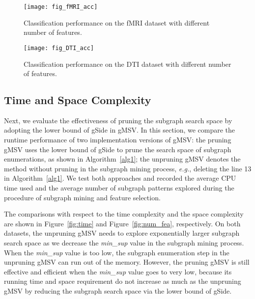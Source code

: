 \documentclass[conference]{IEEEtran}
\newcommand{\gscore}[0]{gSide}
\newcommand{\galgo}[0]{gMSV}
\begin{document}
\begin{figure}[t]
\centering
    \begin{minipage}[l]{\columnwidth}
      \centering
      \texttt{[image: fig\_fMRI\_acc]}
    \end{minipage}
\caption{Classification performance on the fMRI dataset with different number of features.}\label{fig:fMRI}
\end{figure}\begin{figure}[t]
\centering
    \begin{minipage}[l]{\columnwidth}
      \centering
      \texttt{[image: fig\_DTI\_acc]}
    \end{minipage}
\caption{Classification performance on the DTI dataset with different number of features.}\label{fig:DTI}
\end{figure}\subsection{Time and Space Complexity}

Next, we evaluate the effectiveness of pruning the subgraph search space by adopting the lower bound of {\gscore} in {\galgo}. In this section, we compare the runtime performance of two implementation versions of {\galgo}: the pruning {\galgo} uses the lower bound of {\gscore} to prune the search space of subgraph enumerations, as shown in Algorithm~\ref{alg1}; the unpruning {\galgo} denotes the method without pruning in the subgraph mining process, \emph{e.g.}, deleting the line 13 in Algorithm~\ref{alg1}. We test both approaches and recorded the average CPU time used and the average number of subgraph patterns explored during the procedure of subgraph mining and feature selection.

The comparisons with respect to the time complexity and the space complexity are shown in Figure~\ref{fig:time} and Figure~\ref{fig:num_fea}, respectively. On both datasets, the unpruning {\galgo} needs to explore exponentially larger subgraph search space as we decrease the \emph{min\_sup} value in the subgraph mining process. When the \emph{min\_sup} value is too low, the subgraph enumeration step in the unpruning {\galgo} can run out of the memory. However, the pruning {\galgo} is still effective and efficient when the \emph{min\_sup} value goes to very low, because its running time and space requirement do not increase as much as the unpruning {\galgo} by reducing the subgraph search space via the lower bound of {\gscore}.
\end{document}

